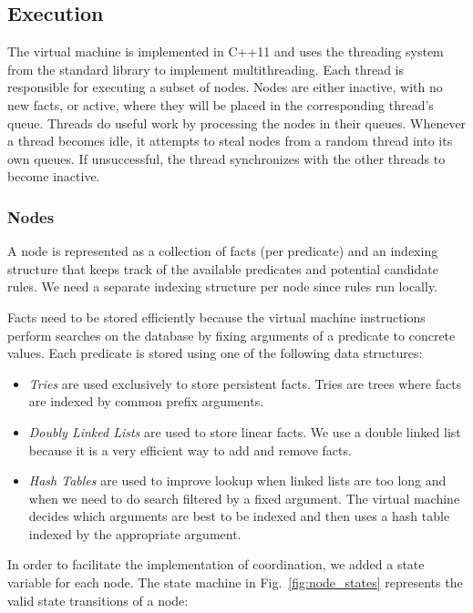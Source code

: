 \subsection{Execution}

The virtual machine is implemented in C++11 and uses the threading system from
the standard library to implement multithreading. Each thread is responsible
for executing a subset of nodes. Nodes are either inactive, with no new facts,
or active, where they will be placed in the corresponding thread's queue.
Threads do useful work by processing the nodes in their queues. Whenever a
thread becomes idle, it attempts to steal nodes from a random thread into its
own queues. If unsuccessful, the thread synchronizes with the other threads to
become inactive.

\subsubsection{Nodes}

A node is represented as a collection of facts (per predicate) and an indexing structure that
keeps track of the available predicates and potential candidate rules. We need
a separate indexing structure per node since rules run locally.

Facts need to be stored efficiently because the virtual machine instructions
perform searches on the database by fixing arguments of a predicate to concrete
values. Each predicate is stored using one of the following data structures:

\begin{itemize}
\item \emph{Tries} are used exclusively to store 
  persistent facts. Tries are trees where facts are indexed by common
  prefix arguments.
\item \emph{Doubly Linked Lists} are used to store 
  linear facts. We use a double linked list because it is a very
   efficient way to add and remove facts.
\item \emph{Hash Tables} are used to improve lookup when 
  linked lists are too long and when we need to do search filtered by
  a fixed argument. The virtual machine decides which arguments are
  best to be indexed and then uses a hash table
  indexed by the appropriate argument.
\end{itemize}

In order to facilitate the implementation of coordination, we added a state
variable for each node. The state machine in
Fig.~\ref{fig:node_states} represents the valid state transitions of a node:

